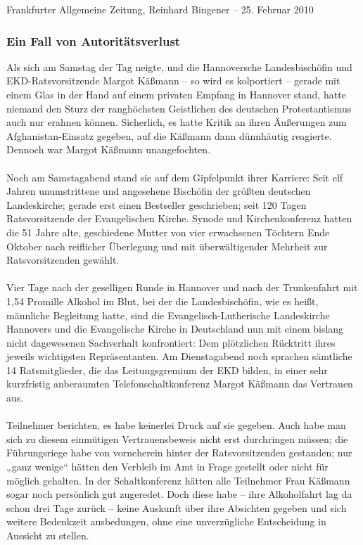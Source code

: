 \documentclass[a4paper,12pt,twoside]{scrbook}
\begin{document}
\newpage
Frankfurter Allgemeine Zeitung, Reinhard Bingener \hfill -- \hfill 25. Februar 2010
\subsubsection{Ein Fall von Autoritätsverlust}
Als sich am Samstag der Tag neigte, und die Hannoversche Landesbischöfin und EKD-Ratsvorsitzende Margot Käßmann – so wird es kolportiert – gerade mit einem Glas in der Hand auf einem privaten Empfang in Hannover stand, hatte niemand den Sturz der ranghöchsten Geistlichen des deutschen Protestantismus auch nur erahnen können. Sicherlich, es hatte Kritik an ihren Äußerungen zum Afghanistan-Einsatz gegeben, auf die Käßmann dann dünnhäutig reagierte. Dennoch war Margot Käßmann unangefochten.
\\\\
Noch am Samstagabend stand sie auf dem Gipfelpunkt ihrer Karriere: Seit elf Jahren unumstrittene und angesehene Bischöfin der größten deutschen Landeskirche; gerade erst einen Bestseller geschrieben; seit 120 Tagen Ratsvorsitzende der Evangelischen Kirche. Synode und Kirchenkonferenz hatten die 51 Jahre alte, geschiedene Mutter von vier erwachsenen Töchtern Ende Oktober nach reiflicher Überlegung und mit überwältigender Mehrheit zur Ratsvorsitzenden gewählt.
\\\\
Vier Tage nach der geselligen Runde in Hannover und nach der Trunkenfahrt mit 1,54 Promille Alkohol im Blut, bei der die Landesbischöfin, wie es heißt, männliche Begleitung hatte, sind die Evangelisch-Lutherische Landeskirche Hannovers und die Evangelische Kirche in Deutschland nun mit einem bislang nicht dagewesenen Sachverhalt konfrontiert: Dem plötzlichen Rücktritt ihres jeweils wichtigsten Repräsentanten. Am Dienstagabend noch sprachen sämtliche 14 Ratsmitglieder, die das Leitungsgremium der EKD bilden, in einer sehr kurzfristig anberaumten Telefonschaltkonferenz Margot Käßmann das Vertrauen aus.\\\\
Teilnehmer berichten, es habe keinerlei Druck auf sie gegeben. Auch habe man sich zu diesem einmütigen Vertrauensbeweis nicht erst durchringen müssen; die Führungsriege habe von vorneherein hinter der Ratsvorsitzenden gestanden; nur „ganz wenige“ hätten den Verbleib im Amt in Frage gestellt oder nicht für möglich gehalten. In der Schaltkonferenz hätten alle Teilnehmer Frau Käßmann sogar noch persönlich gut zugeredet. Doch diese habe – ihre Alkoholfahrt lag da schon drei Tage zurück – keine Auskunft über ihre Absichten gegeben und sich weitere Bedenkzeit ausbedungen, ohne eine unverzügliche Entscheidung in Aussicht zu stellen.
\end{document}
